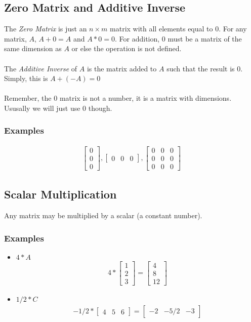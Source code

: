 \documentclass[14pt]{extarticle}
\begin{document}
\subsection{Zero Matrix and Additive Inverse}
The \textit{Zero Matrix} is just an $n\times m$ matrix with all elements equal to 0. For any matrix, $A$, $A+0=A$ and $A*0 =0$. For addition, $0$ must be a matrix of the same dimension as $A$ or else the operation is not defined.
\\\\
The \textit{Additive Inverse} of $A$ is the matrix added to $A$ such that the result is $0$. Simply, this is $A+ (-A) = 0$
\\\\
Remember, the $0$ matrix is not a number, it is a matrix with dimensions. Ususally we will just use 0 though.
\subsubsection*{Examples}
	\begin{align*}
		\begin{bmatrix}	0 \\ 0 \\ 0	\end{bmatrix}, 
		\begin{bmatrix} 0 & 0 & 0 \end{bmatrix},
		\begin{bmatrix}
			0 & 0 & 0 \\
			0 & 0 & 0 \\
			0 & 0 & 0
		\end{bmatrix}
	\end{align*}

\subsection{Scalar Multiplication}
Any matrix may be multiplied by a scalar (a constant number).
\subsubsection*{Examples}
\begin{itemize}
	\item $4*A$
	\begin{align*}
		4 * \begin{bmatrix}
			1 \\
			2 \\
			3
		\end{bmatrix} = 
		\begin{bmatrix}
			4 \\
			8 \\
			12
		\end{bmatrix}
	\end{align*}
	\item $1/2*C$
	\begin{align*}
		-1/2 * \begin{bmatrix}
			4 & 5 & 6
		\end{bmatrix} = 
		\begin{bmatrix}
			-2 & -5/2 & -3
		\end{bmatrix}
	\end{align*}
\end{itemize}
\end{document}
